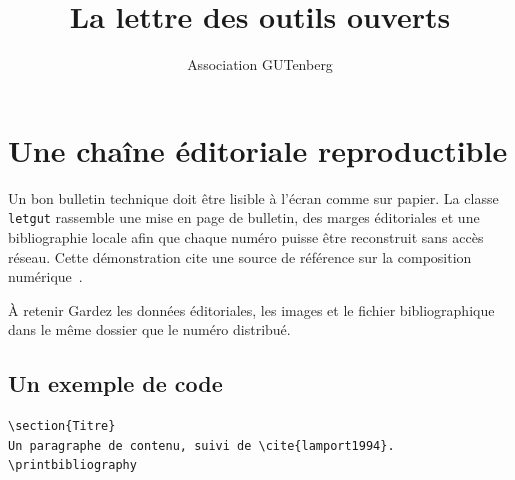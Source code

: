 \documentclass[
  final,
  screen,
  editorial=false,
  informations=false,
  membership-reminder=false,
  detailedtoc=2,
  number=42,
  date=2026-08
]{letgut}
\title{La lettre des outils ouverts}
\author{Association GUTenberg}
\begin{document}
\maketitle
\makeatletter
{}
\makeatother


\section{Une chaîne éditoriale reproductible}

Un bon bulletin technique doit être lisible à l'écran comme sur papier. La
classe \texttt{letgut} rassemble une mise en page de bulletin, des marges
éditoriales et une bibliographie locale afin que chaque numéro puisse être
reconstruit sans accès réseau. Cette démonstration cite une source de référence
sur la composition numérique~\cite{knuth1984}.

\begin{announcement}[color=orange!65!black,colback=yellow!10]{À retenir}
  Gardez les données éditoriales, les images et le fichier bibliographique dans
  le même dossier que le numéro distribué.
\end{announcement}

\subsection{Un exemple de code}

\begin{lstlisting}[language={[LaTeX]TeX},caption={Une section minimale}]
\section{Titre}
Un paragraphe de contenu, suivi de \cite{lamport1994}.
\printbibliography
\end{lstlisting}

\printbibliography[heading=subtitle,title={Références}]
\end{document}

